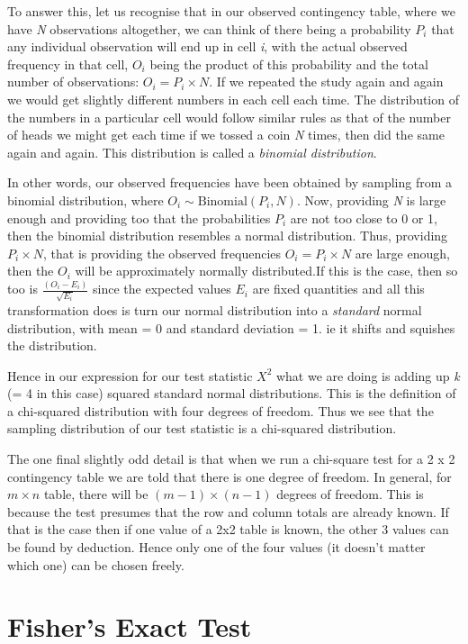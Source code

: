 \documentclass[
  letterpaper,
  DIV=11,
  numbers=noendperiod]{scrreprt}
\begin{document}
To answer this, let us recognise that in our observed contingency table,
where we have \emph{N} observations altogether, we can think of there
being a probability \(P_i\) that any individual observation will end up
in cell \emph{i}, with the actual observed frequency in that cell,
\(O_i\) being the product of this probability and the total number of
observations: \(O_i = P_i\times N\). If we repeated the study again and
again we would get slightly different numbers in each cell each time.
The distribution of the numbers in a particular cell would follow
similar rules as that of the number of heads we might get each time if
we tossed a coin \emph{N} times, then did the same again and again. This
distribution is called a \emph{binomial distribution}.

In other words, our observed frequencies have been obtained by sampling
from a binomial distribution, where \(O_i \sim \text{Binomial}(P_i,N)\).
Now, providing \emph{N} is large enough and providing too that the
probabilities \(P_i\) are not too close to 0 or 1, then the binomial
distribution resembles a normal distribution. Thus, providing
\(P_i\times N\), that is providing the observed frequencies
\(O_i=P_i\times N\) are large enough, then the \(O_i\) will be
approximately normally distributed.If this is the case, then so too is
\(\frac{(O_i-E_i)}{\sqrt{E_i}}\) since the expected values \(E_i\) are
fixed quantities and all this transformation does is turn our normal
distribution into a \emph{standard} normal distribution, with mean = 0
and standard deviation = 1. ie it shifts and squishes the distribution.

Hence in our expression for our test statistic \(X^2\) what we are doing
is adding up \emph{k} (= 4 in this case) squared standard normal
distributions. This is the definition of a chi-squared distribution with
four degrees of freedom. Thus we see that the sampling distribution of
our test statistic is a chi-squared distribution.

The one final slightly odd detail is that when we run a chi-square test
for a 2 x 2 contingency table we are told that there is one degree of
freedom. In general, for \(m \times  n\) table, there will be
\((m-1)\times(n-1)\) degrees of freedom. This is because the test
presumes that the row and column totals are already known. If that is
the case then if one value of a 2x2 table is known, the other 3 values
can be found by deduction. Hence only one of the four values (it doesn't
matter which one) can be chosen freely.

\chapter{Fisher's Exact Test}\label{fishers-exact-test}
\end{document}
